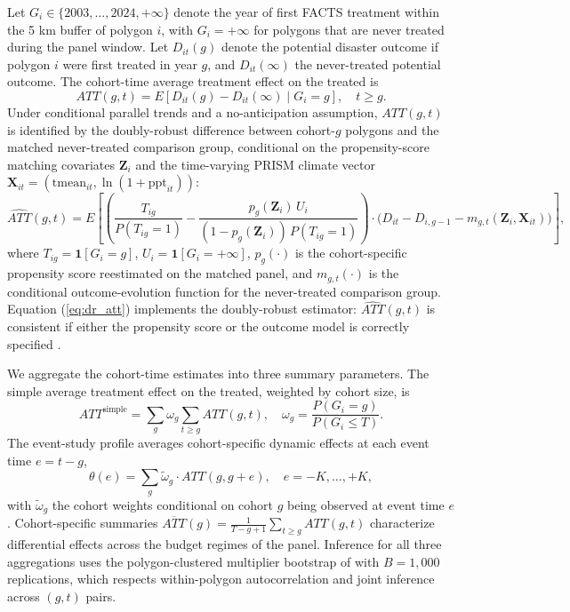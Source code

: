 \documentclass[12pt, letterpaper]{article}
\begin{document}
Let $G_i \in \{2003, \ldots, 2024, +\infty\}$ denote the year of first FACTS treatment within the 5 km buffer of polygon $i$, with $G_i = +\infty$ for polygons that are never treated during the panel window. Let $D_{it}(g)$ denote the potential disaster outcome if polygon $i$ were first treated in year $g$, and $D_{it}(\infty)$ the never-treated potential outcome. The cohort-time average treatment effect on the treated is
\begin{equation}
ATT(g, t) = E\!\left[D_{it}(g) - D_{it}(\infty) \mid G_i = g\right], \quad t \geq g.
\label{eq:att_gt}
\end{equation}
Under conditional parallel trends and a no-anticipation assumption, $ATT(g, t)$ is identified by the doubly-robust difference between cohort-$g$ polygons and the matched never-treated comparison group, conditional on the propensity-score matching covariates $\mathbf{Z}_i$ and the time-varying PRISM climate vector $\mathbf{X}_{it} = (\mathrm{tmean}_{it}, \ln(1 + \mathrm{ppt}_{it}))$:
\begin{equation}
\widehat{ATT}(g, t) = E\!\left[\!\left(\frac{T_{ig}}{P(T_{ig} = 1)} - \frac{p_g(\mathbf{Z}_i)\, U_i}{(1 - p_g(\mathbf{Z}_i))\, P(T_{ig} = 1)}\right) \cdot \big(D_{it} - D_{i, g-1} - m_{g,t}(\mathbf{Z}_i, \mathbf{X}_{it})\big)\right],
\label{eq:dr_att}
\end{equation}
where $T_{ig} = \mathbf{1}[G_i = g]$, $U_i = \mathbf{1}[G_i = +\infty]$, $p_g(\cdot)$ is the cohort-specific propensity score reestimated on the matched panel, and $m_{g,t}(\cdot)$ is the conditional outcome-evolution function for the never-treated comparison group. Equation (\ref{eq:dr_att}) implements the doubly-robust estimator: $\widehat{ATT}(g, t)$ is consistent if either the propensity score or the outcome model is correctly specified \citep{callaway2021}.

We aggregate the cohort-time estimates into three summary parameters. The simple average treatment effect on the treated, weighted by cohort size, is
\begin{equation}
ATT^{\text{simple}} = \sum_{g} \omega_g \sum_{t \geq g} ATT(g, t), \quad \omega_g = \frac{P(G_i = g)}{P(G_i \leq T)}.
\label{eq:att_simple}
\end{equation}
The event-study profile averages cohort-specific dynamic effects at each event time $e = t - g$,
\begin{equation}
\theta(e) = \sum_{g} \tilde{\omega}_g \cdot ATT(g, g + e), \quad e = -K, \ldots, +K,
\label{eq:event_study}
\end{equation}
with $\tilde{\omega}_g$ the cohort weights conditional on cohort $g$ being observed at event time $e$. Cohort-specific summaries $\overline{ATT}(g) = \frac{1}{T - g + 1} \sum_{t \geq g} ATT(g, t)$ characterize differential effects across the budget regimes of the panel. Inference for all three aggregations uses the polygon-clustered multiplier bootstrap of \citet{callaway2021} with $B = 1{,}000$ replications, which respects within-polygon autocorrelation and joint inference across $(g, t)$ pairs.
\end{document}
